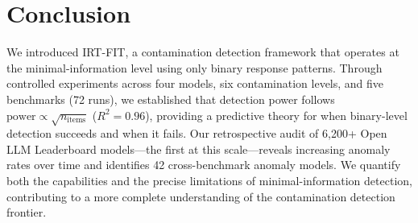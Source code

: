 \documentclass[11pt,a4paper]{article}
\begin{document}
\section{Conclusion}
\label{sec:conclusion}

We introduced IRT-FIT, a contamination detection framework that operates at the minimal-information level using only binary response patterns. Through controlled experiments across four models, six contamination levels, and five benchmarks (72 runs), we established that detection power follows $\text{power} \propto \sqrt{n_{\text{items}}}$ ($R^2=0.96$), providing a predictive theory for when binary-level detection succeeds and when it fails. Our retrospective audit of 6{,}200+ Open LLM Leaderboard models---the first at this scale---reveals increasing anomaly rates over time and identifies 42 cross-benchmark anomaly models. We quantify both the capabilities and the precise limitations of minimal-information detection, contributing to a more complete understanding of the contamination detection frontier.


\end{document}
